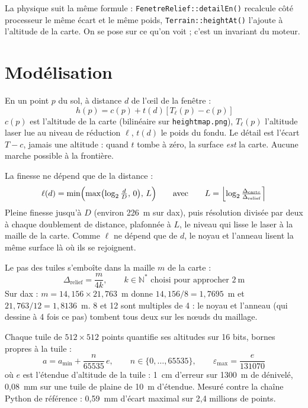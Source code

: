 \documentclass[a4paper,12pt]{article}
\newcommand{\code}[1]{\texttt{#1}}
\begin{document}
La physique suit la même formule : \code{FenetreRelief::detailEn()} recalcule
côté processeur le même écart et le même poids, \code{Terrain::heightAt()}
l'ajoute à l'altitude de la carte. On se pose sur ce qu'on voit ; c'est un
invariant du moteur.

\section{Modélisation}

En un point $p$ du sol, à distance $d$ de l'œil de la fenêtre :
\begin{equation*}
  h(p) = c(p) + t(d)\,\bigl[\,T_{\ell}(p) - c(p)\,\bigr]
\end{equation*}
$c(p)$ est l'altitude de la carte (bilinéaire sur \code{heightmap.png}),
$T_{\ell}(p)$ l'altitude laser lue au niveau de réduction $\ell$, $t(d)$ le
poids du fondu. Le détail est l'écart $T - c$, jamais une altitude : quand $t$
tombe à zéro, la surface \emph{est} la carte. Aucune marche possible à la
frontière.

La finesse ne dépend que de la distance :
\begin{equation*}
  \ell(d) = \min\Bigl(\max\bigl(\log_2 \tfrac{d}{D},\, 0\bigr),\, L\Bigr)
  \qquad\text{avec}\qquad
  L = \Bigl\lfloor \log_2 \tfrac{\Delta_{\text{carte}}}{\Delta_{\text{relief}}} \Bigr\rceil
\end{equation*}
Pleine finesse jusqu'à $D$ (environ 226~m sur dax), puis résolution divisée
par deux à chaque doublement de distance, plafonnée à $L$, le niveau qui lisse
le laser à la maille de la carte. Comme $\ell$ ne dépend que de $d$, le noyau
et l'anneau lisent la même surface là où ils se rejoignent.

Le pas des tuiles s'emboîte dans la maille $m$ de la carte :
\begin{equation*}
  \Delta_{\text{relief}} = \frac{m}{4k},
  \qquad k \in \mathbb{N}^{*} \text{ choisi pour approcher } 2~\text{m}
\end{equation*}
Sur dax : $m = 14{,}156 \times 21{,}763$~m donne $14{,}156/8 = 1{,}7695$~m et
$21{,}763/12 = 1{,}8136$~m. 8 et 12 sont multiples de 4 : le noyau et l'anneau
(qui dessine à 4 fois ce pas) tombent tous deux sur les nœuds du maillage.

Chaque tuile de $512 \times 512$ points quantifie ses altitudes sur 16 bits,
bornes propres à la tuile :
\begin{equation*}
  a = a_{\min} + \frac{n}{65535}\, e,
  \qquad n \in \{0, \dots, 65535\},
  \qquad \varepsilon_{\max} = \frac{e}{131070}
\end{equation*}
où $e$ est l'étendue d'altitude de la tuile : 1~cm d'erreur sur 1300~m de
dénivelé, 0,08~mm sur une tuile de plaine de 10~m d'étendue. Mesuré contre la
chaîne Python de référence : 0,59~mm d'écart maximal sur 2,4 millions de
points.
\end{document}

